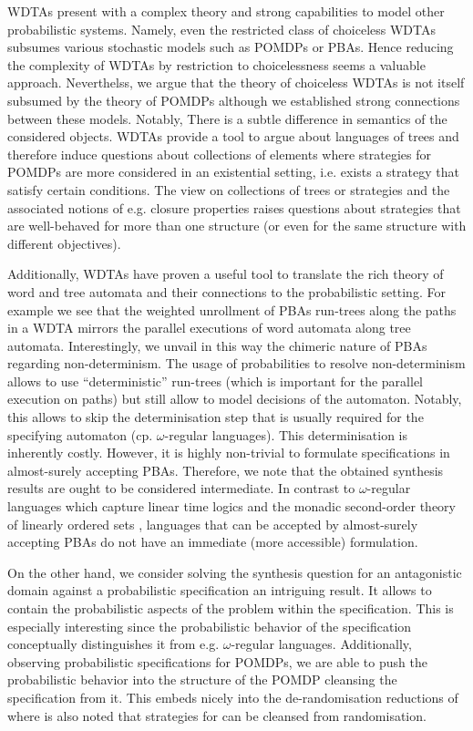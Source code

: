 \acp{WDTA} present with a complex theory and strong capabilities to model other
probabilistic systems. Namely, even the restricted class of choiceless
\acp{WDTA} subsumes various stochastic models such as \acp{POMDP} or \acp{PBA}.
Hence reducing the complexity of \acp{WDTA} by restriction to choicelessness
seems a valuable approach. Neverthelss, we argue that the theory of choiceless
\acp{WDTA} is not itself subsumed by the theory of \acp{POMDP} although we
established strong connections between these models. Notably, There is a subtle
difference in semantics of the considered objects. \acp{WDTA} provide a tool to
argue about languages of trees and therefore induce questions about collections
of elements where strategies for \acp{POMDP} are more considered in an
existential setting, i.e. exists a strategy that satisfy certain conditions.
The view on collections of trees or strategies and the associated notions of
e.g. closure properties raises questions about strategies that are well-behaved
for more than one structure (or even for the same structure with different
objectives).

Additionally, \acp{WDTA} have proven a useful tool to translate the rich theory
of word and tree automata and their connections to the probabilistic setting.
For example we see that the weighted unrollment of \acp{PBA} run-trees along
the paths in a \ac{WDTA} mirrors the parallel executions of word automata along
tree automata. Interestingly, we unvail in this way the chimeric nature of
\acp{PBA} regarding non-determinism. The usage of probabilities to resolve
non-determinism allows to use \enquote{deterministic} run-trees (which is
important for the parallel execution on paths) but still allow to model
decisions of the automaton. Notably, this allows to skip the determinisation
step that is usually required for the specifying automaton (cp.
$\omega$-regular languages). This determinisation is inherently costly.
However, it is highly non-trivial to formulate specifications in almost-surely
accepting \acp{PBA}. Therefore, we note that the obtained synthesis results
are ought to be considered intermediate. In contrast to
$\omega$-regular languages which capture linear time logics
\cite{PrinciplesOfMC} and the monadic second-order theory of linearly ordered
sets \cite{DecMethRestArith}, languages that can be accepted by almost-surely
accepting \acp{PBA} do not have an immediate (more accessible) formulation.

On the other hand, we consider solving the synthesis question for an
antagonistic domain against a probabilistic specification an intriguing result.
It allows to contain the probabilistic aspects of the problem within the
specification. This is especially interesting since the probabilistic behavior
of the specification conceptually distinguishes it from e.g. $\omega$-regular
languages. Additionally, observing probabilistic specifications for
\acp{POMDP}, we are able to push the probabilistic behavior into the structure
of the \ac{POMDP} cleansing the specification from it. This embeds nicely into
the de-randomisation reductions of \cite{RandomnessForFree} where is also noted
that strategies for \eve{} can be cleansed from randomisation.
